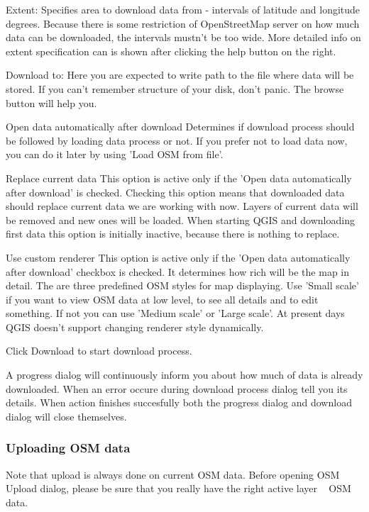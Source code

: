 \begin{description}
\item Extent: Specifies area to download data from - intervals of latitude 
and longitude degrees. Because there is some restriction of OpenStreetMap 
server on how much data can be downloaded, the intervals mustn't be too 
wide. More detailed info on extent specification can is shown after 
clicking the help button on the right.
\item Download to: 
Here you are expected to write path to the file where data will be stored. If
you can't remember structure of your disk, don't panic. The browse button
will help you.
\item Open data automatically after download 
Determines if download process should be followed by loading data process or
not. If you prefer not to load data now, you can do it later by using 'Load
OSM from file'.
\item Replace current data
This option is active only if the 'Open data automatically after download' is
checked. Checking this option means that downloaded data should replace
current data we are working with now. Layers of current data will be removed
and new ones will be loaded. When starting QGIS and downloading first data
this option is initially inactive, because there is nothing to replace.
\item Use custom renderer
This option is active only if the 'Open data automatically after download'
checkbox is checked. It determines how rich will be the map in detail. The
are three predefined OSM styles for map displaying. Use 'Small scale' if you
want to view OSM data at low level, to see all details and to edit something.
If not you can use 'Medium scale' or 'Large scale'. At present days QGIS
doesn't support changing renderer style dynamically.
\end{description}

Click Download to start download process.

A progress dialog will continuously inform you about how much of data is
already downloaded. When an error occure during download process dialog tell
you its details. When action finishes succesfully both the progress dialog
and download dialog will close themselves.

\subsubsection{Uploading OSM data}  

Note that upload is always done on current OSM data. Before opening OSM
Upload dialog, please be sure that you really have the right active layer ~
OSM data.

